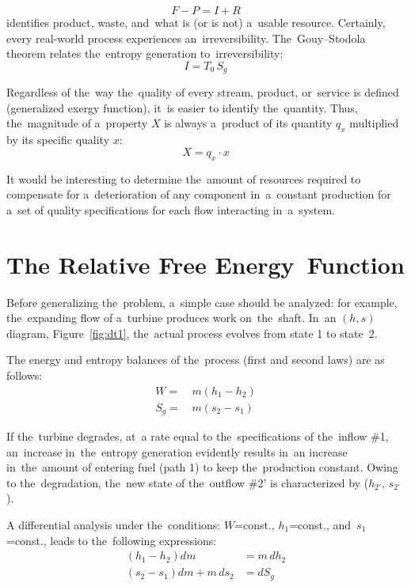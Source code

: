 \documentclass[energies,article,accept,moreauthors,pdftex]{Definitions/mdpi}
\begin{document}
\begin{equation}
   F - P = I + R
\label{eq:FPR}
\end{equation}
identifies product, waste, and~what is (or is not) a~usable resource. Certainly, every real-world process experiences an~irreversibility. The~Gouy–Stodola theorem relates the~entropy generation to~irreversibility:
\begin{equation}
    I = T_0\,S_g
\label{eq:gouystodola}
\end{equation}

Regardless of the~way the~quality of every stream, product, or~service is defined (generalized exergy function), it~is easier to identify the~quantity. Thus, the~magnitude of a~property $X$ is always a~product of its quantity $q_x$ multiplied by its specific quality $x$:
\begin{equation}
X=q_x\cdot x
\end{equation}

It would be interesting to determine the~amount of resources required to compensate for a~deterioration of any component in~a~constant production for a~set of quality specifications for each flow interacting in~a~system.

\section{The Relative Free Energy~Function}
Before generalizing the~problem, a~simple case should be analyzed: for example, the~expanding flow of a~turbine produces work on~the~shaft. In~an $(h, s)$ diagram, Figure~\ref{fig:dt1}, the~actual process evolves from state 1 to state~2.

The energy and entropy balances of the~process (first and second laws) are as follows:
\begin{align}
W=&\,m\left(h_1-h_2\right)\\
S_g=&\,m\left(s_2-s_1\right)
\end{align}

If the~turbine degrades, at~a rate equal to the~specifications of the~inflow \#1, an~increase in~the~entropy generation evidently results in~an increase in~the~amount of entering fuel (path 1) to keep the~production constant. Owing to the~degradation, the~new state of the~outflow \#2' is characterized by  ($h_{2'}$, $s_{2'}$).

A differential analysis under the~conditions: $W$=const., $h_1$=const., and~$s_1$=const., leads to the~following expressions:
\begin{align}
\left(h_1-h_2\right) dm &= m \, dh_2\\
\left(s_2-s_1\right) dm + m \, ds_2 &= dS_g
\end{align}
\end{document}
